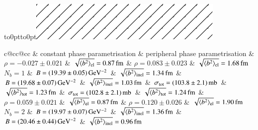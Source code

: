 \begin{table}
\caption{%
Parameters derived from the parameter-comparison fits presented in Figures~\ref{fig:fits common con} and \ref{fig:fits common per}. The rows correspond to different numbers of parameters in the nuclear modulus exponent. The left-hand (right-hand) side columns refer to fits with constant, Eq.~(\ref{eq:nuc phase con}), (peripheral, Eq.~(\ref{eq:nuc phase per})) nuclear phase parametrisation. The RMS values of impact parameter $b$ correspond to elastic (el), inelastic (inel) and any (tot) collisions. The combination $N_b = 1$ with constant phase is hatched as it is excluded by data, see Figure~\ref{fig:fits common con}.
}%
\vskip-3mm
\label{tab:fits common}
\begin{center}
\hbox to0pt{\hskip-26mm\vbox to0pt{\vskip5.5mm\includegraphics{fig/hatch_overlay.pdf}\vss}\hss}%
\small
\setlength{\tabcolsep}{5pt}
\begin{tabular}{c@{\hskip20pt}cc@{\hskip20pt}cc}
\hline
\hline
	& \hfil constant phase parametrisation \hfil & \hfil peripheral phase parametrisation\hfil  \cr
\hline
 			& $\rho = -0.027 \pm 0.021$ & $\sqrt{\langle b^2\rangle_{\rm el}} = 0.87\,{\rm fm}$					& $\rho = 0.083 \pm 0.023$ & $\sqrt{\langle b^2\rangle_{\rm el}} = 1.68\,{\rm fm}$					\cr
$N_b = 1$	& $B = (19.39 \pm 0.05)\,{\rm GeV^{-2}}$ & $\sqrt{\langle b^2\rangle_{\rm inel}} = 1.34\,{\rm fm}$		& $B = (19.68 \pm 0.07)\,{\rm GeV^{-2}}$ & $\sqrt{\langle b^2\rangle_{\rm inel}} = 1.03\,{\rm fm}$		\cr
			& $\sigma_{\rm tot} = (103.8 \pm 2.1)\,{\rm mb}$ & $\sqrt{\langle b^2\rangle_{\rm tot}} = 1.23\,{\rm fm}$	& $\sigma_{\rm tot} = (102.8 \pm 2.1)\,{\rm mb}$ & $\sqrt{\langle b^2\rangle_{\rm tot}} = 1.24\,{\rm fm}$	\cr\hline
%                                                                                                                                                                                                                   
 			& $\rho = 0.059 \pm 0.021$ & $\sqrt{\langle b^2\rangle_{\rm el}} = 0.87\,{\rm fm}$						& $\rho = 0.120 \pm 0.026$ & $\sqrt{\langle b^2\rangle_{\rm el}} = 1.90\,{\rm fm}$						\cr
$N_b = 2$	& $B = (19.97 \pm 0.07)\,{\rm GeV^{-2}}$ & $\sqrt{\langle b^2\rangle_{\rm inel}} = 1.36\,{\rm fm}$		& $B = (20.46 \pm 0.44)\,{\rm GeV^{-2}}$ & $\sqrt{\langle b^2\rangle_{\rm inel}} = 0.96\,{\rm fm}$		\cr

\end{tabular}
\end{center}
\end{table}
